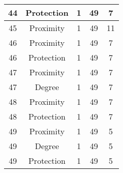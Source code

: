 \documentclass[results.tex]{subfiles}
\begin{document}
\begin{center}
\begin{tabular}{| c || c | c | c | c |}
            \hline
            44                      & Protection                   & 1                      & 49                      & 7                    \\
            \hline
            45                      & Proximity                    & 1                      & 49                      & 11                   \\
            \hline
            46                      & Proximity                    & 1                      & 49                      & 7                    \\
            \hline
            46                      & Protection                   & 1                      & 49                      & 7                    \\
            \hline
            47                      & Proximity                    & 1                      & 49                      & 7                    \\
            \hline
            47                      & Degree                       & 1                      & 49                      & 7                    \\
            \hline
            48                      & Proximity                    & 1                      & 49                      & 7                    \\
            \hline
            48                      & Protection                   & 1                      & 49                      & 7                    \\
            \hline
            49                      & Proximity                    & 1                      & 49                      & 5                    \\
            \hline
            49                      & Degree                       & 1                      & 49                      & 5                    \\
            \hline
            49                      & Protection                   & 1                      & 49                      & 5                    \\
            \hline
        \end{tabular}
    \end{center}
\end{document}

